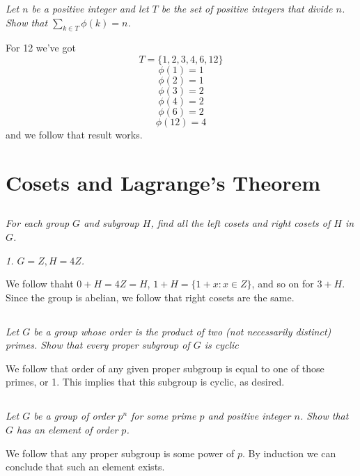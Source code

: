 \documentclass[11pt,oneside,titlepage]{book}
\newcommand{\set}[1]{\{ #1 \}}
\begin{document}
\textit{Let $n$ be a positive integer and let $T$ be the set of positive integers
  that divide $n$. Show that $\sum_{k \in T}{\phi(k)} = n$.}

For 12 we've got
$$T = \set{1, 2, 3, 4, 6, 12}$$
$$\phi(1) = 1$$
$$\phi(2) = 1$$
$$\phi(3) = 2$$
$$\phi(4) = 2$$
$$\phi(6) = 2$$
$$\phi(12) = 4$$
and we follow that result works.

\section{Cosets and Lagrange's Theorem}

\subsection{}

\textit{For each group $G$ and subgroup $H$, find all the left cosets and right cosets
  of $H$ in $G$.}

\textit{1. $G = Z, H = 4Z$.}

We follow thaht $0 + H = 4Z = H$, $1 + H = \set{1 + x: x \in Z}$, and so on for $3 + H$.
Since the group is abelian, we follow that right cosets are the same.

\subsection{}

\textit{Let $G$ be a group whose order is the product of two (not necessarily distinct)
  primes. Show that every proper subgroup of $G$ is cyclic}

We follow that order of any given proper subgroup is equal to one of those primes, or 1. 
This implies that this subgroup is cyclic, as desired.

\subsection{}

\textit{Let $G$ be a group of order $p^n$ for some prime $p$ and positive integer $n$.
  Show that $G$ has an element of order $p$.}

We follow that any proper subgroup is some power of $p$. By induction we can conclude that
such an element exists.

\subsection{}
\end{document}
